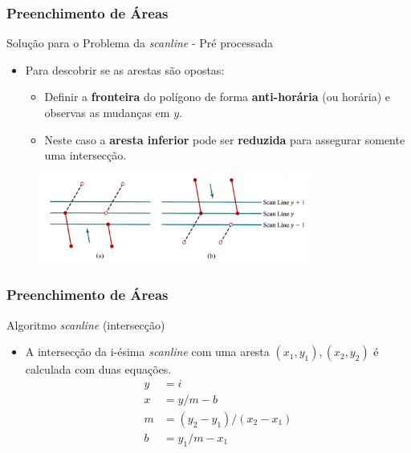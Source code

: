 \documentclass{beamer}
\begin{document}
\begin{frame}
\frametitle{Preenchimento de Áreas}

	\begin{block}{Solução para o Problema da \textit{scanline} - Pré processada}
		\begin{itemize}
			\item Para descobrir se as arestas são opostas:
			\begin{itemize}
				\item Definir a \textbf{fronteira} do polígono de forma \textbf{anti-horária} (ou horária) e observas as mudanças em $y$.
				\item Neste caso a \textbf{aresta inferior} pode ser \textbf{reduzida} para assegurar somente uma intersecção.
			\end{itemize}
		\end{itemize}
	\end{block}
	
	\begin{figure}[!h]
			\begin{center}
				\includegraphics[width=0.8\textwidth]{Figures/ScaPro}
			\end{center}
		\end{figure}
	
\end{frame}

\begin{frame}
\frametitle{Preenchimento de Áreas}

	\begin{block}{Algoritmo \textit{scanline} (intersecção)}
		\begin{itemize}
			\item A intersecção da i-ésima \textit{scanline} com uma aresta ${(x_1,y_1),(x_2,y_2)}$ é calculada com duas equações.
			\begin{align*}
				y &= i \\
				x &= y/m-b \\
				m &= (y_2-y_1)/(x_2-x_1)\\
				b &= y_1/m-x_1
			\end{align*}
		\end{itemize}
	\end{block}
	
\end{frame}
\end{document}
